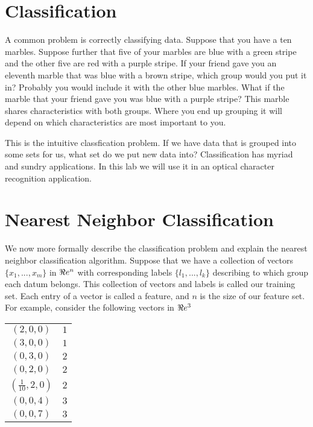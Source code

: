 \label{Ch:KNN}


\section*{Classification}

A common problem is correctly classifying data.  Suppose that you have a ten marbles.  Suppose further that five of your marbles are blue with a green stripe and the other five are red with a purple stripe.  If your friend gave you an eleventh marble that was blue with a brown stripe, which group would you put it in?  Probably you would include it with the other blue marbles.  What if the marble that your friend gave you was blue with a purple stripe?  This marble shares characteristics with both groups.  Where you end up grouping it will depend on which characteristics are most important to you.

This is the intuitive classfication problem.  If we have data that is grouped into some sets for us, what set do we put new data into?  Classification has myriad and sundry applications.  In this lab we will use it in an optical character recognition application.

\section*{Nearest Neighbor Classification}

We now more formally describe the classification problem and explain the nearest neighbor classification algorithm.  Suppose that we have a collection of vectors $\{x_1, ..., x_m\}$ in $\Re e^n$ with corresponding labels $\{l_1, ..., l_k\}$ describing to which group each datum belongs.  This collection of vectors and labels is called our training set.  Each entry of a vector is called a feature, and $n$ is the size of our feature set.  For example, consider the following vectors in $\Re e^3$

\begin{center}
\begin{tabular}{cc}
$(2,0,0)$ & $1$ \\
$(3,0,0)$ & $1$ \\
$(0,3,0)$ & $2$ \\
$(0,2,0)$ & $2$ \\
$(\frac{1}{10},2,0)$ & $2$ \\
$(0,0,4)$ & $3$ \\
$(0,0,7)$ & $3$ \\
\end{tabular}
\end{center}

